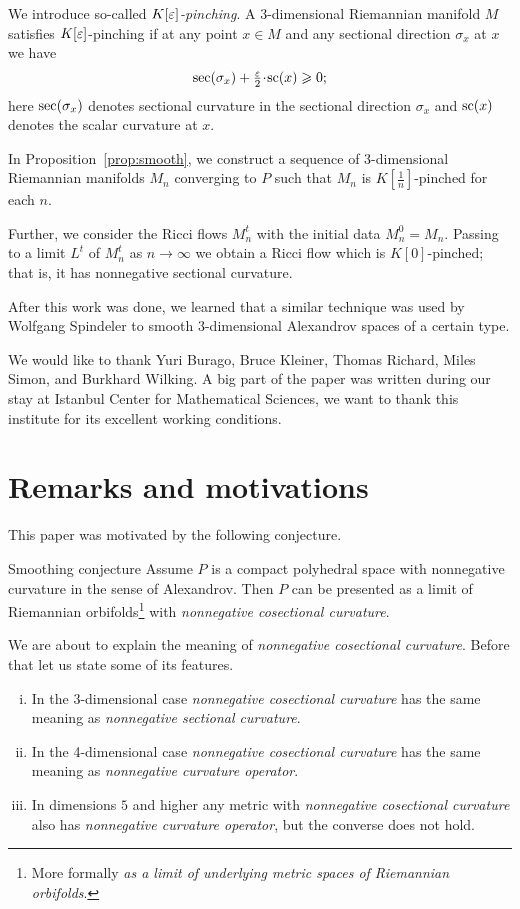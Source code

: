 \documentclass[a4paper,10pt]{amsart}
\begin{document}
We introduce so-called \emph{$K[\varepsilon]$-pinching}.
A 3-dimensional Riemannian manifold $M$ satisfies $K[\varepsilon]$-pinching
if at any point $x\in M$ and any sectional direction $\sigma_x$ at $x$ we have
\[\Sec(\sigma_x)+\tfrac\eps2\cdot\R(x)\ge 0;\]
here $\mathrm{sec}(\sigma_x)$ denotes sectional curvature in the sectional direction $\sigma_x$ and $\mathrm{sc}(x)$ denotes the scalar curvature at $x$.

In Proposition~\ref{prop:smooth},
we construct a sequence of 3-dimensional Riemannian manifolds $M_n$ converging to $P$ such that
 $M_n$ is  $K[\tfrac1n]$-pinched for each $n$.
 
Further, 
we consider the Ricci flows $M_n^t$ with the initial data $M_n^0=M_n$.
Passing to a limit $L^t$ of $M_n^t$ as $n\to\infty$ we obtain a Ricci flow which is $K[0]$-pinched; that is, it has nonnegative sectional curvature. \qeds

After this work was done, we learned that a similar technique was used by Wolfgang Spindeler \cite{spindeler} to smooth 3-dimensional Alexandrov spaces of a certain type.

We would like to thank 
Yuri Burago,
Bruce Kleiner,
Thomas Richard,
Miles Simon,
and Burkhard Wilking.
A big part of the paper was written during our stay at Istanbul Center for Mathematical Sciences,
we want to thank this institute for its excellent working conditions.


\section{Remarks and motivations}

This paper was motivated by the following conjecture. 

\begin{thm}{Smoothing conjecture}\label{conj:main}
Assume $P$ is a compact polyhedral space with nonnegative curvature in the sense of Alexandrov. 
Then $P$ can be presented as a limit of Riemannian  orbifolds\footnote{More formally \emph{as a limit of underlying metric spaces of Riemannian orbifolds}.}
with \emph{nonnegative cosectional curvature}.
\end{thm}

We are about to explain the meaning of \emph{nonnegative cosectional curvature}.
Before that let us state some of its features.
\begin{enumerate}[(i)]
\item In the 3-dimensional case 
\emph{nonnegative cosectional curvature} 
has the same meaning as 
\emph{nonnegative sectional curvature}.
\item In the 4-dimensional case 
\emph{nonnegative cosectional curvature} 
has the same meaning as 
\emph{nonnegative curvature operator}.
\item In dimensions $5$ and higher 
any metric with
\emph{nonnegative cosectional curvature} 
also has 
\emph{nonnegative curvature operator},
but the converse does not hold.
\end{enumerate}
\end{document}
